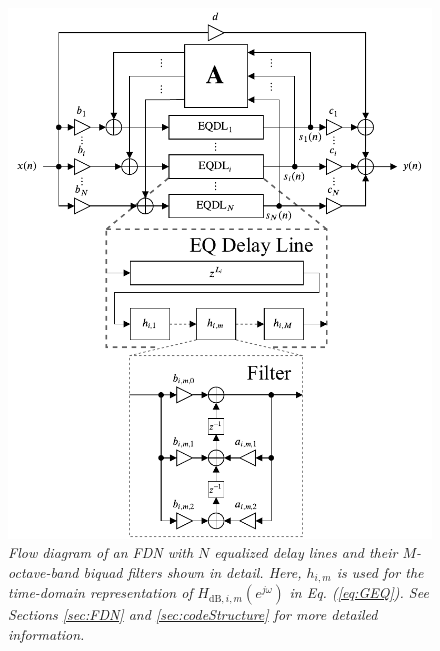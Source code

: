 \documentclass[twoside,a4paper]{article}
\begin{document}
\begin{figure}[t!]

\centering
\includegraphics[width=\columnwidth]{Figures/FDN.pdf}
\caption{\textit{Flow diagram of an FDN with $N$ equalized delay lines and their $M$-octave-band biquad filters shown in detail. Here, $h_{i,m}$ is used for the time-domain representation of} $H_{\text{dB},i,m}(e^{j\omega})$\textit{ in Eq. (\ref{eq:GEQ}). See Sections \ref{sec:FDN} and \ref{sec:codeStructure} for more detailed information. }}
\label{fig:diag}
\end{figure}
\end{document}
